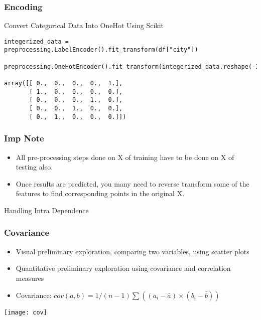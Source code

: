 \begin{frame}[fragile]\frametitle{Encoding}
Convert Categorical Data Into OneHot Using Scikit
\begin{lstlisting}
integerized_data = preprocessing.LabelEncoder().fit_transform(df["city"])

preprocessing.OneHotEncoder().fit_transform(integerized_data.reshape(-1,1)).toarray()

array([[ 0.,  0.,  0.,  0.,  1.],
       [ 1.,  0.,  0.,  0.,  0.],
       [ 0.,  0.,  0.,  1.,  0.],
       [ 0.,  0.,  1.,  0.,  0.],
       [ 0.,  1.,  0.,  0.,  0.]])
\end{lstlisting}
\end{frame}

\begin{frame}[fragile]\frametitle{Imp Note}
	\begin{itemize}
	\item All pre-processing steps done on X of training have to be done on X of testing also.
	\item Once results are predicted, you many need to reverse transform some of the features to find corresponding points in the original X.
	\end{itemize}
\end{frame}



\begin{frame}
  \begin{center}
    {\Large Handling Intra Dependence}
  \end{center}
\end{frame}


\begin{frame}[fragile] \frametitle{Covariance}

\begin{itemize}
\item Visual preliminary exploration, comparing two variables, using scatter plots
\item Quantitative preliminary exploration using covariance and correlation measures
\item Covariance: $cov(a,b) = 1/(n-1) \sum ((a_i - \bar{a}) \times (b_i - \bar{b}))$

\end{itemize}


\begin{center}
\texttt{[image: cov]}
\end{center}

\end{frame}


